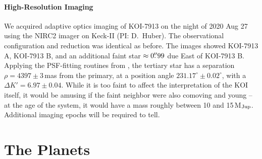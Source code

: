 \documentclass[12pt,twocolumn,linenumbers]{aastex63}
\begin{document}
% 
% 

\paragraph{High-Resolution Imaging}

We acquired adaptive optics imaging of KOI-7913 on the night of 2020
Aug 27 using the NIRC2 imager on Keck-II (PI: D.~Huber).  The
observational configuration and reduction was identical as before.
The images showed KOI-7913 A, KOI-7913 B, and an additional faint star
$\approx0\mbox{$.\!\!^{\prime\prime}$}99$ due East of KOI-7913 B.  Applying the PSF-fitting
routines from \citet{kraus_impact_2016}, the tertiary star has a
separation $\rho = 4397 \pm 3$\,mas from the primary, at a position
angle $231.17^\circ \pm 0.02^\circ$, with a $\Delta K' = 6.97 \pm
0.04$.  While it is too faint to affect the interpretation of the KOI
itself, it would be amusing if the faint neighbor were also comoving
and young -- at the age of the system, it would have a mass roughly
between 10 and 15\,M$_{\rm Jup}$.  Additional imaging epochs will be
required to tell.




\section{The Planets}
\label{sec:planets}
\end{document}
